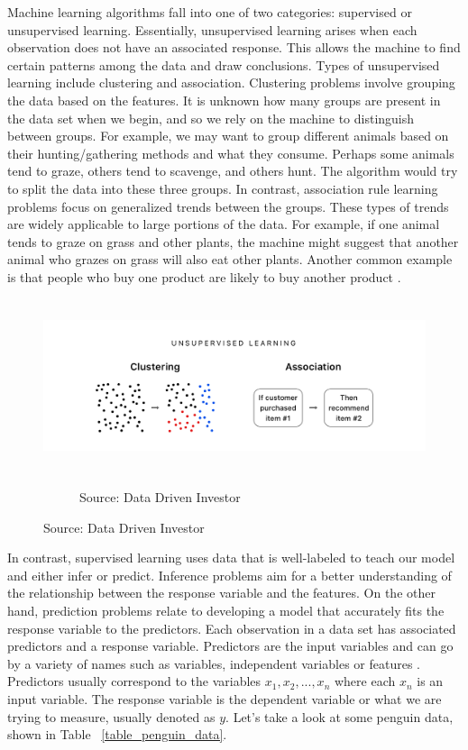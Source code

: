 \documentclass[12pt]{article}
\begin{document}
Machine learning algorithms fall into one of two categories: supervised or unsupervised learning. Essentially, unsupervised learning arises when each observation does not have an associated response. This allows the machine to find certain patterns among the data and draw conclusions. Types of unsupervised learning include clustering and association. Clustering problems involve grouping the data based on the features. It is unknown how many groups are present in the data set when we begin, and so we rely on the machine to distinguish between groups. For example, we may want to group different animals based on their hunting/gathering methods and what they consume. Perhaps some animals tend to graze, others tend to scavenge, and others hunt. The algorithm would try to split the data into these three groups. In contrast, association rule learning problems focus on generalized trends between the groups. These types of trends are widely applicable to large portions of the data. For example, if one animal tends to graze on grass and other plants, the machine might suggest that another animal who grazes on grass will also eat other plants. Another common example is that people who buy one product are likely to buy another product \cite{supvunsup}.

\begin{figure}[h]
    \centering
    \includegraphics[height=2in]{Figures/clustering_v_association.png}
    \captionsetup[subfigure]{labelformat=empty}
    \begin{subfigure}[]{0.5\textwidth}
         \centering
         \caption{Source: Data Driven Investor}
     \end{subfigure}
    \label{fig1}
\end{figure}

In contrast, supervised learning uses data that is well-labeled to teach our model and either infer or predict. Inference problems aim for a better understanding of the relationship between the response variable and the features. On the other hand, prediction problems relate to developing a model that accurately fits the response variable to the predictors. Each observation in a data set has associated predictors and a response variable. Predictors are the input variables and can go by a variety of names such as variables, independent variables or features \cite{introstatlearning}. Predictors usually correspond to the variables $x_1,x_2,...,x_n$ where each $x_n$ is an input variable. The response variable is the dependent variable or what we are trying to measure, usually denoted as $y$. Let's take a look at some penguin data, shown in Table ~\ref{table_penguin_data}.
\end{document}
